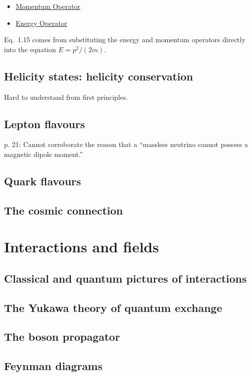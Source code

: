 \documentclass{book}
\begin{document}
\begin{itemize}
\item \href{https://en.wikipedia.org/wiki/Momentum_operator}{Momentum Operator}
\item \href{https://en.wikipedia.org/wiki/Energy_operator}{Energy Operator}
\end{itemize}

Eq.\ 1.15 comes from substituting the energy and momentum operators directly into the equation $E = p^2/(2m)$.

\section{Helicity states: helicity conservation}

Hard to understand from first principles.

\section{Lepton flavours}

p. 21: Cannot corroborate the reason that a ``massless neutrino cannot possess a magnetic dipole moment.''

\section{Quark flavours}
\section{The cosmic connection}

\chapter{Interactions and fields}
\section{Classical and quantum pictures of interactions}
\section{The Yukawa theory of quantum exchange}
\section{The boson propagator}
\section{Feynman diagrams}
\end{document}
